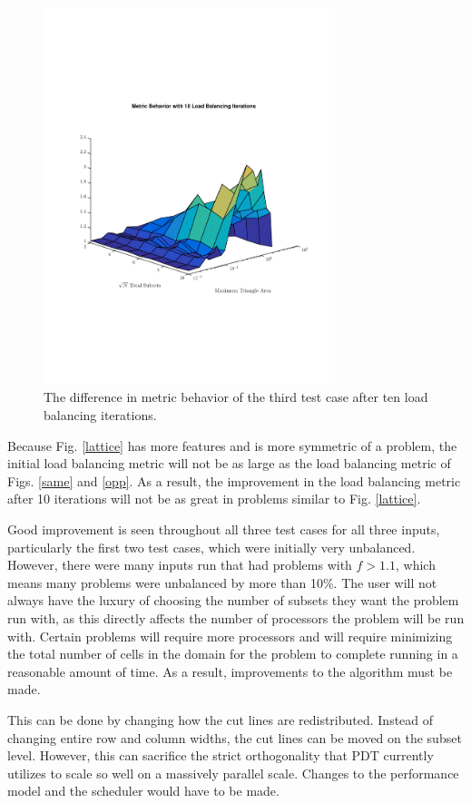 \documentclass{anstrans}
\begin{document}
\begin{figure}
\centering
\includegraphics[width=85mm, trim = 0cm 5cm 0cm 5cm,clip]{figures/lattice_iter.pdf}
\caption{The difference in metric behavior of the third test case after ten load balancing iterations.}
\label{latticeiter}
\end{figure}

Because Fig. \ref{lattice} has more features and is more symmetric of a problem, the initial load balancing metric will not be as large as the load balancing metric of Figs. \ref{same} and \ref{opp}. As a result, the improvement in the load balancing metric after 10 iterations will not be as great in problems similar to Fig. \ref{lattice}. 

Good improvement is seen throughout all three test cases for all three inputs, particularly the first two test cases, which were initially very unbalanced. However, there were many inputs run that had problems with $f > 1.1$, which means many problems were unbalanced by more than 10\%. The user will not always have the luxury of choosing the number of subsets they want the problem run with, as this directly affects the number of processors the problem will be run with. Certain problems will require more processors and will require minimizing the total number of cells in the domain for the problem to complete running in a reasonable amount of time. As a result, improvements to the algorithm must be made. 

This can be done by changing how the cut lines are redistributed. Instead of changing entire row and column widths, the cut lines can be moved on the subset level. However, this can sacrifice the strict orthogonality that PDT currently utilizes to scale so well on a massively parallel scale\cite{mpadams2015}. Changes to the performance model and the scheduler would have to be made.
\end{document}
